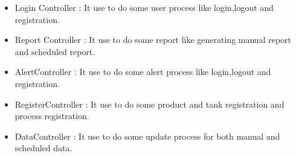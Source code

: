 \begin{flushleft}
	\vspace*{1\baselineskip}
	
	\begin{itemize}
		\item Login Controller : It use to do some user process like login,logout and registration.
		\item Report Controller : It use to do some report like generating manual report and scheduled report.
		\item AlertController : It use to do some alert process like login,logout and registration.
		\item RegisterController :  It use to do some product and tank registration and process registration.
		\item DataController : It use to do some update process for both manual and scheduled data.
	\end{itemize}	
    
	
	
\end{flushleft}